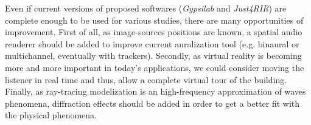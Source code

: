 \documentclass[AMA,STIX1COL]{WileyNJD-v2}
\begin{document}
Even if current versions of proposed softwares (\textit{Gypsilab} \cite{githubGypsi} and \textit{Just4RIR}) are complete enough to be used for various studies, there are many opportunities of improvement. First of all, as image-sources positions are known, a spatial audio renderer should be added to improve current auralization tool (e.g. binaural or multichannel, eventually with trackers). Secondly, as virtual reality is becoming more and more important in today's applications, we could consider moving the listener in real time and thus, allow a complete virtual tour of the building. Finally, as ray-tracing modelization is an high-frequency approximation of waves phenomena, diffraction effects should be added in order to get a better fit with the physical phenomena. 
%
%
\end{document}
